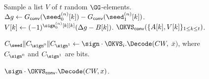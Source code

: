 \begin{figure}
{{\begin{algorithmic}[1]
        \State Sample a list $V$ of $t$ random $\GG$-elements. 
          \State $\Delta g\gets G_{\sf conv}(\seed_0^{(n)}[k]) - G_{\sf conv}(\seed_1^{(n)}[k])$. 
          \State$V[k]\gets (-1)^{\sign_0^{(n)}[k][k]}(\Delta g-B[k])$.
        \EndFor 
        \State \Return $\OKVS_{\sf conv}(\{A[k], V[k]\}_{1\le k\le t})$. 
      \EndProcedure
      \item[]
        \State\Return $C_{\seed}\|C_{\sign^0}\|C_{\sign^1}\gets\sign\cdot\OKVS_i.\Decode(CW,$ $\bar{x})$, where $C_{\sign^0}$ and $C_{\sign^1}$ are bits. \label{alg:okvs_correction}
      \EndProcedure
      \item[]
        \State \Return $\sign\cdot\OKVS_{\sf conv}.\Decode(CW,x)$. \label{alg:okvs_convert_correction}
      \EndProcedure
    \end{algorithmic}}}
  \end{figure}





  
      
      
      